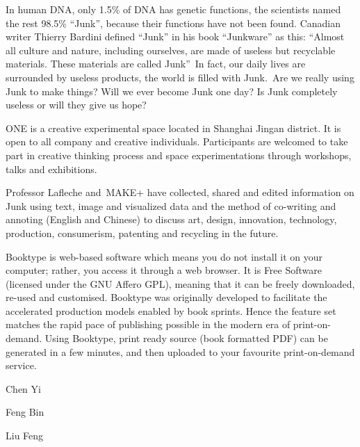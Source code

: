 In human DNA, only 1.5\% of DNA has genetic functions, the scientists
named the rest 98.5\% {\textquotedblleft}Junk{\textquotedblright},
because their functions have not been found. Canadian writer Thierry
Bardini defined {\textquotedblleft}Junk{\textquotedblright} in his book
{\textquotedblleft}Junkware{\textquotedblright} as this:
{\textquotedblleft}Almost all culture and nature, including ourselves,
are made of useless but recyclable materials. These materials are
called Junk{\textquotedblright}~In fact, our daily lives are surrounded
by useless products, the world is filled with Junk.~Are we really using
Junk to make things? Will we ever become Junk one day? Is Junk
completely useless or will they give us hope?


ONE is a creative experimental space located in Shanghai Jingan
district. It is open to all company and creative individuals.
Participants are welcomed to take part in creative thinking process and
space experimentations through workshops, talks and exhibitions.


Professor Lafleche and~MAKE+ have collected, shared and edited
information on Junk using text, image and visualized data and the
method of co-writing and annoting (English and Chinese) to discuss art,
design, innovation, technology, production, consumerism, patenting and
recycling in the future.\newline
\newline
{}

Booktype is web-based software which means you do not install it on your
computer; rather, you access it through a web browser. It is Free
Software (licensed under the GNU Affero GPL), meaning that it can be
freely downloaded, re-used and customised. Booktype was originally
developed to facilitate the accelerated production models enabled by
book sprints. Hence the feature set matches the rapid pace of
publishing possible in the modern era of print-on-demand. Using
Booktype, print ready source (book formatted PDF) can be generated in a
few minutes, and then uploaded to your favourite print-on-demand
service.


Chen Yi

Feng Bin

Liu Feng 

